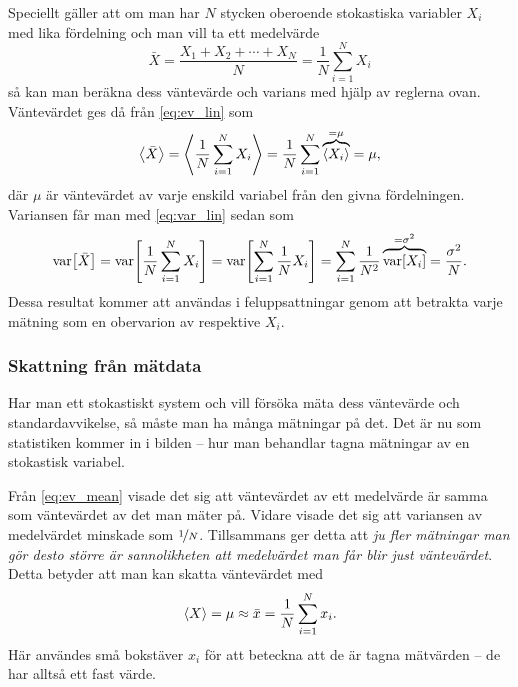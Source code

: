 \documentclass[11pt,a4paper, english, swedish
]{article}
\newcommand{\VAR}[1]{\ensuremath\text{var}\!\left[#1\right]}
\begin{document}
Speciellt gäller att om man har $N$ stycken oberoende stokastiska variabler
$X_i$ med lika fördelning och man vill ta ett medelvärde 
\begin{equation} 
\bar{X} = \frac{X_1+X_2+\cdots+X_N}{N} = \frac{1}{N}\sum_{i=1}^N X_i
\end{equation}
så kan man beräkna dess väntevärde och varians med hjälp av reglerna
ovan. 
Väntevärdet ges då från \eqref{eq:ev_lin} som
\begin{equation}\label{eq:ev_mean}
\ev{\bar{X}} = \ev{\frac{1}{N} \sum_{i=1}^N X_i} 
= \frac{1}{N} \sum_{i=1}^N \overbrace{\ev{X_i}}^{=\mu} 
= \mu,
\end{equation}
där $\mu$ är väntevärdet av varje enskild variabel från den givna
fördelningen. 
Variansen får man med \eqref{eq:var_lin} sedan som
\begin{equation}\label{eq:var_mean}
\VAR{\bar{X}} = \VAR{\frac{1}{N} \sum_{i=1}^N X_i}
= \VAR{\sum_{i=1}^N \frac{1}{N} X_i}
= \sum_{i=1}^N \frac{1}{N^2}\overbrace{\VAR{X_i}}^{=\sigma^2}
= \frac{\sigma^2}{N}.
\end{equation}
Dessa resultat kommer att användas i feluppsattningar genom att
betrakta varje mätning som en obervarion av respektive $X_i$.

\subsubsection{Skattning från mätdata}
Har man ett stokastiskt system och vill försöka mäta dess väntevärde
och standardavvikelse, så måste man ha många mätningar på det. Det är
nu som statistiken kommer in i bilden -- hur man behandlar tagna
mätningar av en stokastisk variabel. 

Från \eqref{eq:ev_mean} visade det sig att väntevärdet av ett
medelvärde är samma som väntevärdet av det man mäter på. Vidare visade
det sig att variansen av medelvärdet minskade som
$\nicefrac{1}{N}$. Tillsammans ger detta att \emph{ju fler mätningar
  man gör desto större är sannolikheten att medelvärdet man får blir
  just väntevärdet}. Detta betyder att man kan skatta väntevärdet med
\begin{equation}\label{eq:ev_approx}
\ev{X} = \mu \approx \bar{x} = \frac{1}{N}\sum_{i=1}^N x_i.
\end{equation}
Här användes små bokstäver $x_i$ för att beteckna att de är tagna
mätvärden -- de har alltså ett fast värde. 
\end{document}
